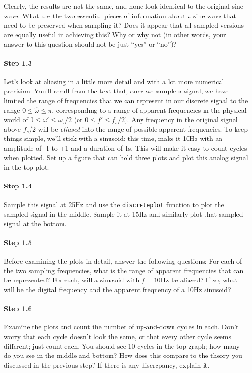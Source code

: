 Clearly, the results are not the same, and none look identical to the
original sine wave. What are the two essential pieces of information
about a sine wave that need to be preserved when sampling it? Does it
appear that all sampled versions are equally useful in achieving this?
Why or why not (in other words, your answer to this question should
not be just ``yes'' or ``no'')?

\paragraph{Step 1.3} Let's look at aliasing in a little more detail
and with a lot more numerical precision. You'll recall from the text
that, once we sample a signal, we have limited the range of
frequencies that we can represent in our discrete signal to the range
$0 \leq \hat{\omega} \leq \pi$, corresponding to a range of apparent
frequencies in the physical world of $0 \leq \omega' \leq \omega_s/2$
(or $0 \leq f' \leq f_s/2$). Any frequency in the original signal
above $f_s/2$ will be \emph{aliased} into the range of possible
apparent frequencies. To keep things simple, we'll stick with a
sinusoid; this time, make it 10Hz with an amplitude of -1 to +1 and a
duration of 1s. This will make it easy to count cycles when
plotted. Set up a figure that can hold three plots and plot this
analog signal in the top plot.

\paragraph{Step 1.4} Sample this signal at 25Hz and use the
\texttt{discreteplot} function to plot the sampled signal in the
middle. Sample it at 15Hz and similarly plot that sampled signal at
the bottom.

\paragraph{Step 1.5} Before examining the plots in detail, answer the
following questions: For each of the two sampling frequencies, what is
the range of apparent frequencies that can be represented? For each,
will a sinusoid with $f = 10$Hz be aliased? If so, what will be the
digital frequency and the apparent frequency of a 10Hz sinusoid?

\paragraph{Step 1.6} Examine the plots and count the number of
up-and-down cycles in each. Don't worry that each cycle doesn't look
the same, or that every other cycle seems different; just count
each. You should see 10 cycles in the top graph; how many do you see
in the middle and bottom? How does this compare to the theory you
discussed in the previous step? If there is any discrepancy, explain it.


